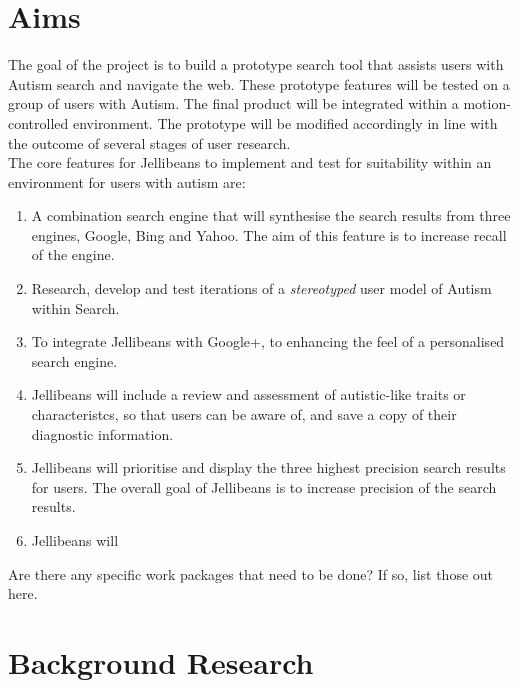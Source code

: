 \documentclass[a4paper, 11pt]{article}
\begin{document}
\section {Aims}
The goal of the project is to build a prototype search tool that assists users with Autism search and navigate the web. These prototype features will be tested on a group of users with Autism. The final product will be integrated within a motion-controlled environment. The prototype will be modified accordingly in line with the outcome of several stages of user research.\\
The core features for Jellibeans to implement and test for suitability within an environment for users with autism are:
\begin{enumerate}
\item{A combination search engine that will synthesise the search results from three engines, Google, Bing and Yahoo. The aim of this feature is to increase recall of the engine.}
\item{Research, develop and test iterations of a \textit{stereotyped} user model of Autism within Search.}
\item{To integrate Jellibeans with Google+, to enhancing the feel of a personalised search engine.}
\item{Jellibeans will include a review and assessment of autistic-like traits or characteristcs, so that users can be aware of, and save a copy of their diagnostic information.}
\item{Jellibeans will prioritise and display the three highest precision search results for users. The overall goal of Jellibeans is to increase precision of the search results.}
\item{Jellibeans will }

\end{enumerate}



Are there any specific work packages that need to be done? If so, list those out here.

\section {Background Research}\label{background} 

\end{document}
